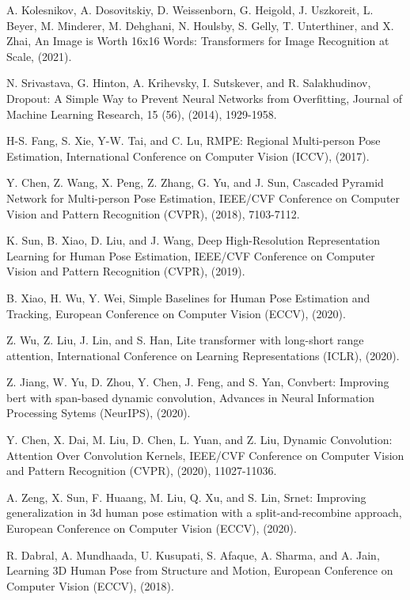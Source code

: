\documentclass{article}
\begin{document}
\begin{thebibliography}{9}
 A. Kolesnikov, A. Dosovitskiy, D. Weissenborn, G. Heigold, J. Uszkoreit, L. Beyer, M. Minderer, M. Dehghani, N. Houlsby, S. Gelly, T. Unterthiner, and X. Zhai, An Image is Worth 16x16 Words: Transformers for Image Recognition at Scale, (2021).

 N. Srivastava, G. Hinton, A. Krihevsky, I. Sutskever, and R. Salakhudinov, Dropout: A Simple Way to Prevent Neural Networks from Overfitting, Journal of Machine Learning Research, 15 (56), (2014), 1929-1958.

 H-S. Fang, S. Xie, Y-W. Tai, and C. Lu, RMPE: Regional Multi-person Pose Estimation, International Conference on Computer Vision (ICCV), (2017).
                  
 Y. Chen, Z. Wang, X. Peng, Z. Zhang, G. Yu, and J. Sun, Cascaded Pyramid Network for Multi-person Pose Estimation, IEEE/CVF Conference on Computer Vision and Pattern Recognition (CVPR), (2018), 7103-7112.

 K. Sun, B. Xiao, D. Liu, and J. Wang, Deep High-Resolution Representation Learning for Human Pose Estimation, IEEE/CVF Conference on Computer Vision and Pattern Recognition (CVPR), (2019).

 B. Xiao, H. Wu, Y. Wei, Simple Baselines for Human Pose Estimation and Tracking, European Conference on Computer Vision (ECCV), (2020).

 Z. Wu, Z. Liu, J. Lin, and S. Han, Lite transformer with long-short range attention, International Conference on Learning Representations (ICLR), (2020).

 Z. Jiang, W. Yu, D. Zhou, Y. Chen, J. Feng, and S. Yan, Convbert: Improving bert with span-based dynamic convolution, Advances in Neural Information Processing Sytems (NeurIPS), (2020).


 Y. Chen, X. Dai, M. Liu, D. Chen, L. Yuan, and Z. Liu, Dynamic Convolution: Attention Over Convolution Kernels, IEEE/CVF Conference on Computer Vision and Pattern Recognition (CVPR), (2020), 11027-11036.

 A. Zeng, X. Sun, F. Huaang, M. Liu, Q. Xu, and S. Lin, Srnet: Improving generalization in 3d human pose estimation with a split-and-recombine approach, European Conference on Computer Vision (ECCV), (2020).

 R. Dabral, A. Mundhaada, U. Kusupati, S. Afaque, A. Sharma, and A. Jain, Learning 3D Human Pose from Structure and Motion, European Conference on Computer Vision (ECCV), (2018).


\end{thebibliography}
\end{document}
